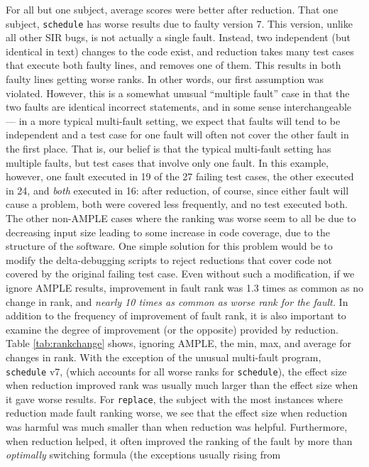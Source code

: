 For all but one subject, average scores were better after reduction.
That one subject, {\tt schedule} has worse results due to faulty
version 7.  This version, unlike all other SIR bugs, is not actually a
single fault.  Instead, two independent (but identical in text)
changes to the code exist, and reduction takes many test cases that
execute both faulty lines, and removes one of them.  This results in
both faulty lines getting worse ranks.  In other words, our first
assumption was violated.  However, this is a somewhat unusual
``multiple fault'' case in that the two faults are identical incorrect
statements, and in some sense interchangeable --- in a more typical
multi-fault setting, we expect that faults will tend to be independent
and a test case for one fault will often not cover the other fault in
the first place.  That is, our belief is that the typical multi-fault
setting has multiple faults, but test cases that involve only one
fault.  In this example, however, one fault executed in 19 of the 27
failing test cases, the other executed in 24, and \emph{both} executed
in 16: after reduction, of course, since either fault will cause a
problem, both were covered less frequently, and no test executed both.
The other non-AMPLE cases where the ranking was worse seem to all be
due to decreasing input size leading to some increase in code
coverage, due to the structure of the software.  One simple solution
for this problem would be to modify the delta-debugging scripts to
reject reductions that cover code not covered by the original failing
test case.  Even without such a modification, if we ignore AMPLE
results, improvement in fault rank was 1.3 times as common as no change
in rank, and \emph{nearly 10 times as common as worse rank for the
fault.}  In addition to the frequency of improvement of fault rank, it
is also important to examine the degree of improvement (or the
opposite) provided by reduction.  Table \ref{tab:rankchange} shows,
ignoring AMPLE, the min, max, and average for changes in rank.  With
the exception of the unusual multi-fault program, {\tt schedule} v7,
(which accounts for all worse ranks for {\tt schedule}), the effect
size when reduction improved rank was usually much larger than the
effect size when it gave worse results.  For {\tt replace}, the
subject with the most instances where reduction made fault ranking
worse, we see that the effect size when reduction was harmful was much
smaller than when reduction was helpful.  Furthermore, when reduction
helped, it often improved the ranking of the fault by more than
\emph{optimally} switching formula (the exceptions usually rising from
